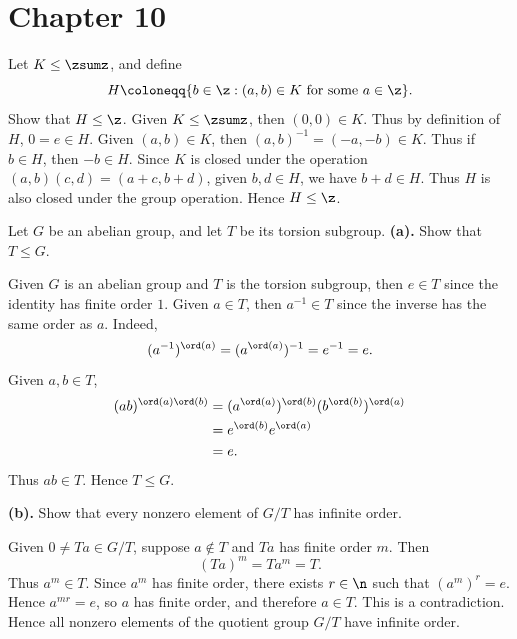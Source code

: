 
\section{Chapter 10}

\begin{problem}[Exercise 1]{
    Let $K \leq \zsumz$, and define
    \[
        H \coloneqq \{b \in \z : (a,b) \in K \text{ for some } a \in \z\}.
    \]
    Show that $H \leq \z$.
}
    Given $K \leq \zsumz$, then $(0,0) \in K$.
    Thus by definition of $H$, $0 = e \in H$.
    Given $(a,b) \in K$, then $(a,b)^{-1} = (-a,-b) \in K$.
    Thus if $b \in H$, then $-b \in H$.
    Since $K$ is closed under the operation $(a,b)(c,d) = (a+c,b+d)$, given $b,d \in H$, we have $b+d \in H$.
    Thus $H$ is also closed under the group operation.
    Hence $H \leq \z$.
\end{problem}

\begin{problem}[Exercise 2]{
    Let $G$ be an abelian group, and let $T$ be its torsion subgroup.
}
    \textbf{(a).}
    Show that $T \leq G$.

    Given $G$ is an abelian group and $T$ is the torsion subgroup, then $e \in T$ since the identity has finite order $1$.
    Given $a \in T$, then $a^{-1} \in T$ since the inverse has the same order as $a$.
    Indeed,
    \[
        (a^{-1})^{\ord(a)} = (a^{\ord(a)})^{-1} = e^{-1} = e.
    \]
    Given $a,b \in T$,
    \begin{align*}
        (ab)^{\ord(a)\ord(b)} &= (a^{\ord(a)})^{\ord(b)}(b^{\ord(b)})^{\ord(a)}\\
        &= e^{\ord(b)}e^{\ord(a)}\\
        &= e.
    \end{align*}
    Thus $ab \in T$.
    Hence $T \leq G$.

    \textbf{(b).}
    Show that every nonzero element of $G/T$ has infinite order.

    Given $0 \neq Ta \in G/T$, suppose $a \notin T$ and $Ta$ has finite order $m$.
    Then
    \[
        (Ta)^m = Ta^m = T.
    \]
    Thus $a^m \in T$.
    Since $a^m$ has finite order, there exists $r \in \n$ such that $(a^m)^r = e$.
    Hence $a^{mr} = e$, so $a$ has finite order, and therefore $a \in T$.
    This is a contradiction.
    Hence all nonzero elements of the quotient group $G/T$ have infinite order.
\end{problem}

